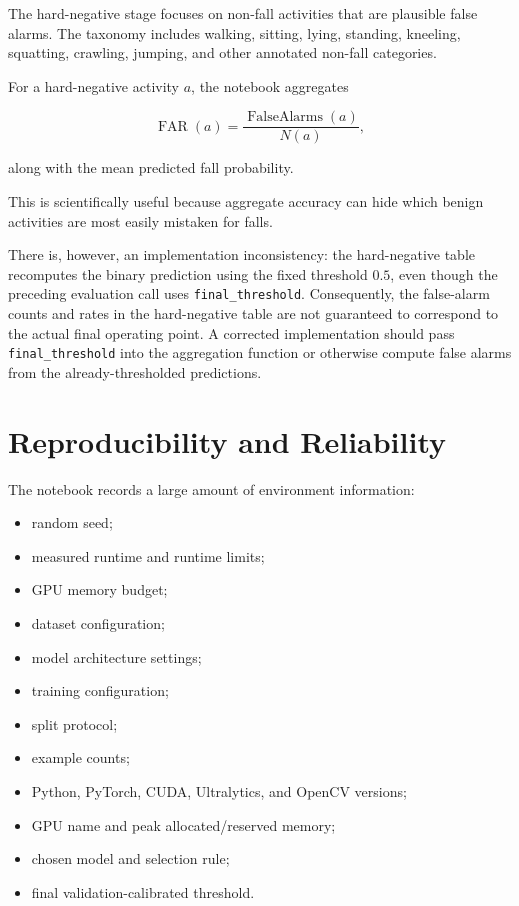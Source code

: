 \documentclass[11pt,a4paper]{article}
\newcommand{\code}[1]{\texttt{#1}}
\begin{document}
The hard-negative stage focuses on non-fall activities that are plausible false alarms. The taxonomy includes walking, sitting, lying, standing, kneeling, squatting, crawling, jumping, and other annotated non-fall categories.

For a hard-negative activity $a$, the notebook aggregates

\begin{equation}
\operatorname{FAR}(a)
=
\frac{
\operatorname{FalseAlarms}(a)
}{
N(a)
},
\end{equation}

along with the mean predicted fall probability.

This is scientifically useful because aggregate accuracy can hide which benign activities are most easily mistaken for falls.

There is, however, an implementation inconsistency: the hard-negative table recomputes the binary prediction using the fixed threshold $0.5$, even though the preceding evaluation call uses \code{final\_threshold}. Consequently, the false-alarm counts and rates in the hard-negative table are not guaranteed to correspond to the actual final operating point. A corrected implementation should pass \code{final\_threshold} into the aggregation function or otherwise compute false alarms from the already-thresholded predictions.

\section{Reproducibility and Reliability}

The notebook records a large amount of environment information:

\begin{itemize}[leftmargin=1.5em]
\item random seed;
\item measured runtime and runtime limits;
\item GPU memory budget;
\item dataset configuration;
\item model architecture settings;
\item training configuration;
\item split protocol;
\item example counts;
\item Python, PyTorch, CUDA, Ultralytics, and OpenCV versions;
\item GPU name and peak allocated/reserved memory;
\item chosen model and selection rule;
\item final validation-calibrated threshold.
\end{itemize}
\end{document}
